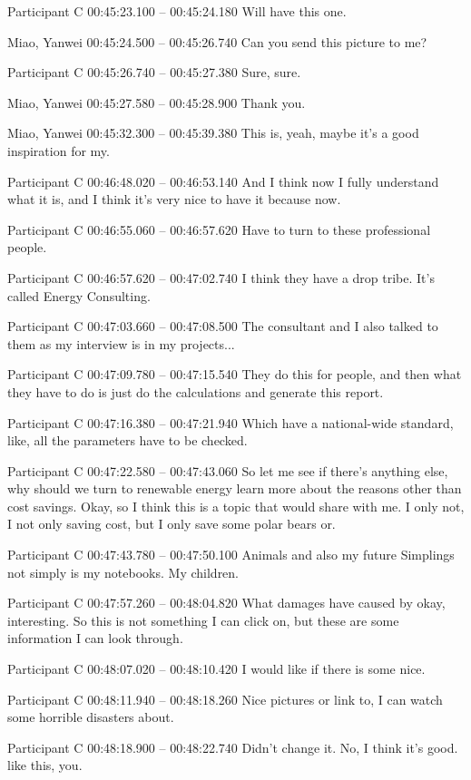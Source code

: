 {Participant C 00:45:23.100 -- 00:45:24.180
Will have this one.

Miao, Yanwei 00:45:24.500 -- 00:45:26.740
Can you send this picture to me?

Participant C 00:45:26.740 -- 00:45:27.380
Sure, sure.

Miao, Yanwei 00:45:27.580 -- 00:45:28.900
Thank you.

Miao, Yanwei 00:45:32.300 -- 00:45:39.380
This is, yeah, maybe it's a good inspiration for my.

Participant C 00:46:48.020 -- 00:46:53.140
And I think now I fully understand what it is, and I think it's very nice to have it because now.

Participant C 00:46:55.060 -- 00:46:57.620
Have to turn to these professional people.

Participant C 00:46:57.620 -- 00:47:02.740
I think they have a drop tribe. It's called Energy Consulting.

Participant C 00:47:03.660 -- 00:47:08.500
The consultant and I also talked to them as my interview is in my projects...

Participant C 00:47:09.780 -- 00:47:15.540
They do this for people, and then what they have to do is just do the calculations and generate this report.

Participant C 00:47:16.380 -- 00:47:21.940
Which have a national-wide standard, like, all the parameters have to be checked.

Participant C 00:47:22.580 -- 00:47:43.060
So let me see if there's anything else, why should we turn to renewable energy learn more about the reasons other than cost savings. Okay, so I think this is a topic that would share with me. I only not, I not only saving cost, but I only save some polar bears or.

Participant C 00:47:43.780 -- 00:47:50.100
Animals and also my future Simplings not simply is my notebooks. My children.

Participant C 00:47:57.260 -- 00:48:04.820
What damages have caused by okay, interesting. So this is not something I can click on, but these are some information I can look through.

Participant C 00:48:07.020 -- 00:48:10.420
I would like if there is some nice.

Participant C 00:48:11.940 -- 00:48:18.260
Nice pictures or link to, I can watch some horrible disasters about.

Participant C 00:48:18.900 -- 00:48:22.740
Didn't change it. No, I think it's good. like this, you.

}
